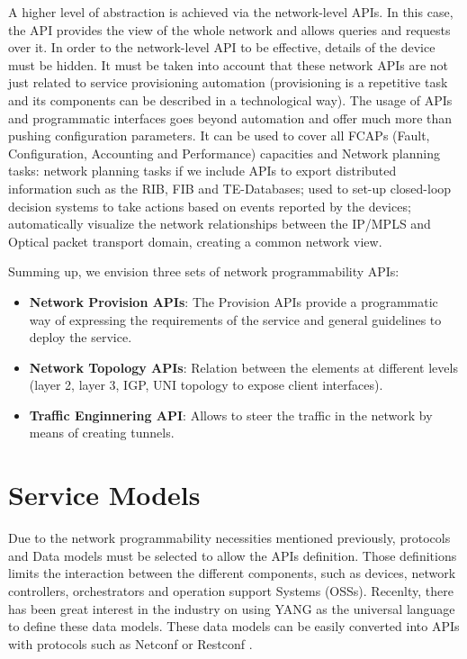 \documentclass[a4paper,fleqn]{cas-dc}
\begin{document}
A higher level of abstraction is achieved via the network-level APIs. In this case, the API provides the view of the whole network and allows queries and requests over it. In order to the network-level API to be effective, details of the device must be hidden. It must be taken into account that these network APIs are not just related to service provisioning automation (provisioning is a repetitive task and its components can be described in a technological way). The usage of APIs and programmatic interfaces goes beyond automation and offer much more than pushing configuration parameters.  It can be used to cover all FCAPs (Fault, Configuration, Accounting and Performance) capacities and Network planning tasks: network planning tasks if we include APIs to export distributed information such as the RIB, FIB and TE-Databases; used to set-up closed-loop decision systems to take actions based on events reported by the devices; automatically visualize the network relationships between the IP/MPLS and Optical packet transport domain, creating a common network view.

Summing up, we envision three sets of network programmability APIs:
\begin{itemize}
\item \textbf{Network Provision APIs}: The Provision APIs provide a programmatic way of expressing the requirements of the service and general guidelines to deploy the service.
\item \textbf{Network Topology APIs}: Relation between the elements at different levels (layer 2, layer 3, IGP, UNI topology to expose client interfaces). 
\item \textbf{Traffic Enginnering API}: Allows to steer the traffic in the network by means of creating tunnels. 
 \end{itemize}
 
\section{Service Models}
\label{section:models}
Due to the network programmability necessities mentioned previously, protocols and Data models must be selected to allow the APIs definition. Those definitions limits the interaction between the different components, such as devices, network controllers, orchestrators and operation support Systems (OSSs). Recenlty, there has been great interest in the industry on using YANG as the universal language to define these data models. These data models can be easily converted into APIs with protocols such as Netconf or Restconf \cite{pugaczewski2017software}. 
\end{document}

